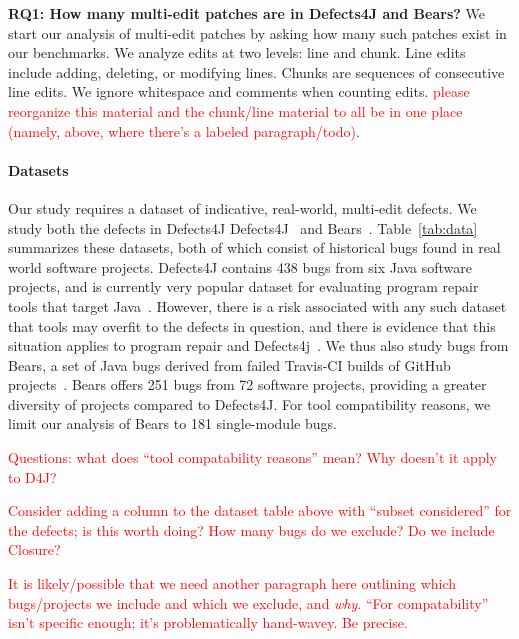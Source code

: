 \documentclass[sigconf, timestamp-false, anonymous=true]{acmart}
\newcommand\todo[1]{\textcolor{red}{#1}}
\begin{document}
\textbf{RQ1: How many multi-edit patches are in Defects4J and Bears?}
We start our analysis of multi-edit patches by asking how many such patches 
exist in our benchmarks. We analyze edits at two levels: line and chunk.
Line edits include adding, deleting, or modifying lines.
Chunks are sequences of consecutive line edits.
We ignore whitespace and comments when counting edits.
\todo{please reorganize this material and the chunk/line material to all be in
  one place (namely, above, where there's a labeled paragraph/todo)}.

\paragraph{Datasets}  Our study requires a dataset of indicative, real-world,
multi-edit defects.  We study both the defects in Defects4J
Defects4J~\cite{defects4j} and Bears~\cite{bears}.  Table~\ref{tab:data}
summarizes these datasets, both of which
consist of historical
bugs found in real world software projects. Defects4J contains 438 bugs from six 
Java software projects, and is currently very popular dataset for evaluating 
program repair tools that target Java~\cite{durieux-repair-them-all}.
However, there is a risk associated with any such dataset that tools may overfit
to the defects in question, and there is evidence that this situation applies to
program repair and Defects4j~\cite{durieux-repair-them-all}. 
We thus also study bugs from Bears, 
a set of Java bugs derived from failed Travis-CI builds of GitHub
projects~\cite{reforurlorsomething}. 
Bears offers 251 bugs from 72 software projects, providing a greater diversity of 
projects compared to Defects4J. For tool compatibility reasons, we limit 
our analysis of Bears to 181 single-module bugs. 

\todo{Questions: what does ``tool compatability reasons'' mean?  Why doesn't it
  apply to D4J?}

\todo{Consider adding a column to the dataset table above with ``subset
  considered'' for the defects; is this worth doing?  How many bugs do we
  exclude? Do we include Closure?}

\todo{It is likely/possible that we need another paragraph here outlining which
  bugs/projects we include and which we exclude, and \emph{why}.  ``For
  compatability'' isn't specific enough; it's problematically hand-wavey.  Be precise.}
\end{document}
